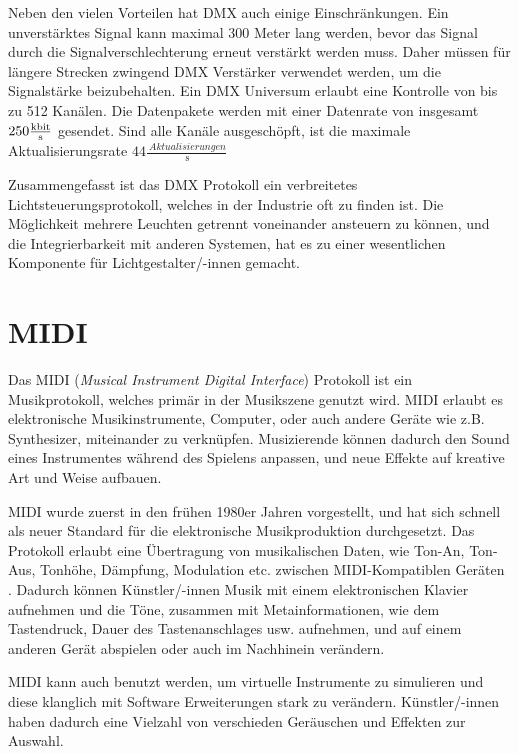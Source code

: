 Neben den vielen Vorteilen hat DMX auch einige Einschränkungen. Ein unverstärktes Signal kann maximal 300 Meter lang werden, bevor das Signal durch die Signalverschlechterung erneut verstärkt werden muss. Daher müssen für längere Strecken zwingend DMX Verstärker verwendet werden, um die Signalstärke beizubehalten. Ein DMX Universum erlaubt eine Kontrolle von bis zu 512 Kanälen. Die Datenpakete werden mit einer Datenrate von insgesamt $250 \frac{\SI{}{\kilo\bit}}{\SI{}{\s}}$ gesendet. Sind alle Kanäle ausgeschöpft, ist die maximale Aktualisierungsrate $44 \frac{\SI{}{Aktualisierungen}}{\SI{}{\s}}$ \cite[S.18, table6]{DMX512-Protocol-Standard}

Zusammengefasst ist das DMX Protokoll ein verbreitetes Lichtsteuerungsprotokoll, welches in der Industrie oft zu finden ist. Die Möglichkeit mehrere Leuchten getrennt voneinander ansteuern zu können, und die Integrierbarkeit mit anderen Systemen, hat es zu einer wesentlichen Komponente für Lichtgestalter/-innen gemacht.


\section{MIDI}

Das MIDI (\emph{Musical Instrument Digital Interface}) Protokoll ist ein Musikprotokoll, welches primär in der Musikszene genutzt wird. MIDI erlaubt es elektronische Musikinstrumente, Computer, oder auch andere Geräte wie z.B. Synthesizer, miteinander zu verknüpfen. Musizierende können dadurch den Sound eines Instrumentes während des Spielens anpassen, und neue Effekte auf kreative Art und Weise aufbauen.

MIDI wurde zuerst in den frühen 1980er Jahren \cite[S.1]{MIDI-Complete-SPECIFICATION} vorgestellt, und hat sich schnell als neuer Standard für die elektronische Musikproduktion durchgesetzt. Das Protokoll erlaubt eine Übertragung von musikalischen Daten, wie Ton-An, Ton-Aus, Tonhöhe, Dämpfung, Modulation etc. zwischen MIDI-Kompatiblen Geräten \cite[S.9]{MIDI-DETAILED-SPECIFICATION}. Dadurch können Künstler/-innen Musik mit einem elektronischen Klavier aufnehmen und die Töne, zusammen mit Metainformationen, wie dem Tastendruck, Dauer des Tastenanschlages usw. aufnehmen, und auf einem anderen Gerät abspielen oder auch im Nachhinein verändern. 

MIDI kann auch benutzt werden, um virtuelle Instrumente zu simulieren und diese klanglich mit Software Erweiterungen stark zu verändern. Künstler/-innen haben dadurch eine Vielzahl von verschieden Geräuschen und Effekten zur Auswahl.

